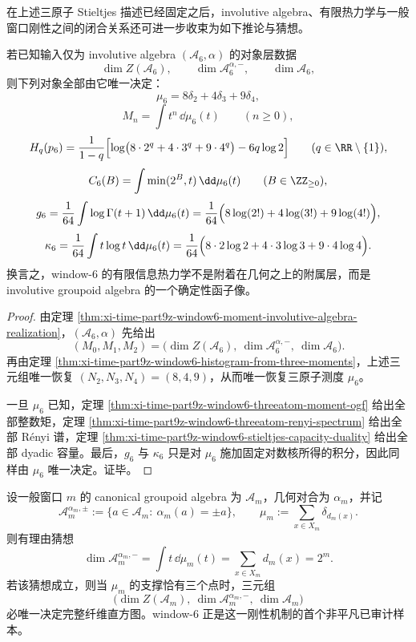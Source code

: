 在上述三原子 Stieltjes 描述已经固定之后，involutive algebra、有限热力学与一般窗口刚性之间的闭合关系还可进一步收束为如下推论与猜想。

\begin{corollary}\label{cor:xi-time-part9z-window6-involutive-thermodynamics-closure}
若已知输入仅为 involutive algebra \((\mathcal A_6,\alpha)\) 的对象层数据
\[
\dim Z(\mathcal A_6),\qquad
\dim \mathcal A_6^{\alpha,-},\qquad
\dim \mathcal A_6,
\]
则下列对象全部由它唯一决定：
\[
\mu_6=8\delta_2+4\delta_3+9\delta_4,
\]
\[
M_n=\int t^n\,\dd\mu_6(t)
\qquad (n\ge 0),
\]
\[
H_q(p_6)
=
\frac{1}{1-q}
\Bigl[
\log\bigl(8\cdot 2^q+4\cdot 3^q+9\cdot 4^q\bigr)-6q\log 2
\Bigr]
\qquad (q\in\RR\setminus\{1\}),
\]
\[
C_6(B)=\int \min(2^B,t)\,\dd\mu_6(t)
\qquad (B\in\ZZ_{\ge 0}),
\]
\[
g_6
=
\frac{1}{64}\int \log\Gamma(t+1)\,\dd\mu_6(t)
=
\frac{1}{64}\Bigl(8\log(2!)+4\log(3!)+9\log(4!)\Bigr),
\]
\[
\kappa_6
=
\frac{1}{64}\int t\log t\,\dd\mu_6(t)
=
\frac{1}{64}\Bigl(8\cdot 2\log 2+4\cdot 3\log 3+9\cdot 4\log 4\Bigr).
\]
换言之，window-\(6\) 的有限信息热力学不是附着在几何之上的附属层，而是 involutive groupoid algebra 的一个确定性函子像。
\end{corollary}
\begin{proof}
由定理 \ref{thm:xi-time-part9z-window6-moment-involutive-algebra-realization}，\((\mathcal A_6,\alpha)\) 先给出
\[
(M_0,M_1,M_2)=\bigl(\dim Z(\mathcal A_6),\ \dim \mathcal A_6^{\alpha,-},\ \dim \mathcal A_6\bigr).
\]
再由定理 \ref{thm:xi-time-part9z-window6-histogram-from-three-moments}，上述三元组唯一恢复 \((N_2,N_3,N_4)=(8,4,9)\)，从而唯一恢复三原子测度 \(\mu_6\)。

一旦 \(\mu_6\) 已知，定理 \ref{thm:xi-time-part9z-window6-threeatom-moment-ogf} 给出全部整数矩，定理 \ref{thm:xi-time-part9z-window6-threeatom-renyi-spectrum} 给出全部 Rényi 谱，定理 \ref{thm:xi-time-part9z-window6-stieltjes-capacity-duality} 给出全部 dyadic 容量。最后，\(g_6\) 与 \(\kappa_6\) 只是对 \(\mu_6\) 施加固定对数核所得的积分，因此同样由 \(\mu_6\) 唯一决定。证毕。
\end{proof}

\begin{conjecture}\label{conj:xi-time-part9z-threeatom-window-firstmoment-antifixed-rigidity}
设一般窗口 \(m\) 的 canonical groupoid algebra 为 \(\mathcal A_m\)，几何对合为 \(\alpha_m\)，并记
\[
\mathcal A_m^{\alpha_m,\pm}:=\{a\in \mathcal A_m:\ \alpha_m(a)=\pm a\},
\qquad
\mu_m:=\sum_{x\in X_m}\delta_{d_m(x)}.
\]
则有理由猜想
\[
\dim \mathcal A_m^{\alpha_m,-}
=
\int t\,\dd\mu_m(t)
=
\sum_{x\in X_m}d_m(x)
=
2^m.
\]
若该猜想成立，则当 \(\mu_m\) 的支撑恰有三个点时，三元组
\[
\bigl(\dim Z(\mathcal A_m),\ \dim \mathcal A_m^{\alpha_m,-},\ \dim \mathcal A_m\bigr)
\]
必唯一决定完整纤维直方图。window-\(6\) 正是这一刚性机制的首个非平凡已审计样本。
\end{conjecture}

